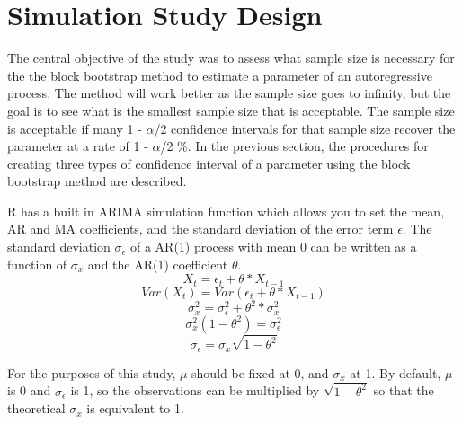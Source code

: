 \documentclass[12pt, letterpaper, titlepage]{article}
\begin{document}
\section{Simulation Study Design}
\label{sec:simdesign}

The central objective of the study was to assess what sample size is necessary for the the block bootstrap method to estimate a parameter of an autoregressive process. The method will work better as the sample size goes to infinity, but the goal is to see what is the smallest sample size that is acceptable. The sample size is acceptable if many 1 - $\alpha$/2 confidence intervals for that sample size recover the parameter at a rate of 1 - $\alpha$/2 \%. In the previous section, the procedures for creating three types of confidence interval of a parameter using the block bootstrap method are described. 


R has a built in ARIMA simulation function which allows you to set the mean, AR and MA coefficients, and the standard deviation of the error term $\epsilon$. The standard deviation $\sigma_{\epsilon}$ of a AR(1) process with mean 0 can be written as a function of $\sigma_{x}$ and the AR(1) coefficient $\theta$. 
\[X_{t} = \epsilon_{t} + \theta*X_{t-1}\]
\[Var(X_{t}) = Var(\epsilon_{t} + \theta*X_{t-1})\]
\[\sigma^2_{x} = \sigma^2_{\epsilon} + \theta^2*\sigma^2_{x}\]
\[\sigma^2_{x}(1 - \theta^2) = \sigma^2_{\epsilon}\]
\[\sigma_{\epsilon} = \sigma_{x}\sqrt{1 - \theta^2}\]


For the purposes of this study, $\mu$ should be fixed at 0, and $\sigma_{x}$ at 1. By default, $\mu$ is 0 and $\sigma_{\epsilon}$ is 1, so the observations can be multiplied by $\sqrt{1 - \theta^2}$ so that the theoretical $\sigma_{x}$ is equivalent to 1.
\end{document}
